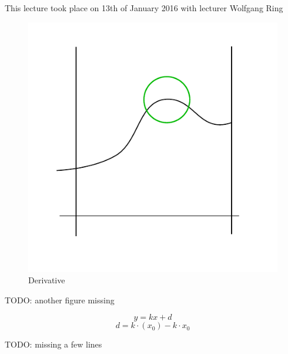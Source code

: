 \documentclass[a4paper,landscape,twocolumn]{article}
\theoremstyle{definition}
\newcommand\meta[3]{\begin{mdframed}[skipbelow=4pt,skipabove=4pt,innermargin=1pt,innerleftmargin=1pt,innerrightmargin=1pt]\begin{center}\small{\textdownarrow{} This #1 took place on #2 with lecturer #3}\end{center}\end{mdframed}}
\begin{document}
\meta{lecture}{13th of January 2016}{Wolfgang Ring}

\begin{figure}[!h]
  \begin{center}
    \includegraphics{img/radius.pdf}
    \caption{Derivative}
    \label{img:deriv-radius}
  \end{center}
\end{figure}

TODO: another figure missing

\[ y = kx + d \]
\[ d = k \cdot(x_0) - k \cdot x_0 \]

TODO: missing a few lines
\end{document}

